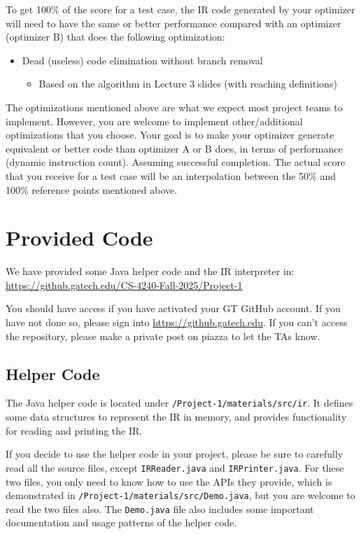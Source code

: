 \documentclass[12pt]{article}
\begin{document}
To get 100\% of the score for a test case, the IR code generated by
your optimizer will need to have the same or better performance
compared with an optimizer (optimizer B) that does the following
optimization:
\begin{itemize}
\item Dead (useless) code elimination without branch removal
\begin{itemize}
\item Based on the algorithm in  Lecture 3 slides (with reaching definitions)
\end{itemize}
\end{itemize}


The optimizations mentioned above are what we expect most project
teams to implement.  However, you are welcome to implement other/additional
optimizations that you choose.  
Your goal is to make your optimizer generate equivalent or better code than
optimizer A or B does,
in terms of performance (dynamic instruction count).  Assuming
successful completion.  The actual score
that you receive for a test case will be an interpolation between the
50\% and 100\% reference points mentioned above.

\section{Provided Code}\label{sec:code}

We have provided some Java helper code and the IR interpreter in:\\
\url{https://github.gatech.edu/CS-4240-Fall-2025/Project-1}

You should have access if you have activated your GT GitHub account.
If you have not done so, please sign into \url{https://github.gatech.edu}. 
If you can't access the repository, please make a private post on piazza to let the TAs know.

\subsection{Helper Code}

The Java helper code is located under \texttt{/Project-1/materials/src/ir}.
It defines some data structures to represent the IR in memory,
and provides functionality for reading and printing the IR.

If you decide to use the helper code in your project, please be sure
to carefully read all the source files, except \texttt{IRReader.java} and \texttt{IRPrinter.java}.
For these two files, you only need to know how to use the APIs they provide,
which is demonstrated in \texttt{/Project-1/materials/src/Demo.java}, but you are
welcome to read the two files also.
The \texttt{Demo.java} file also includes some important documentation and usage patterns of the helper code.
\end{document}

